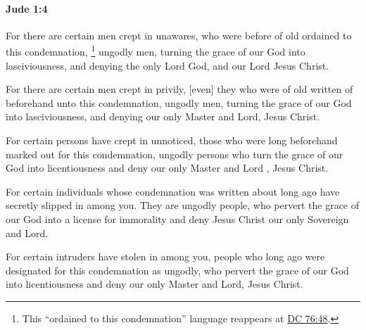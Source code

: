 		\paragraph{Jude 1:4} %
			\label{JUDE-1-4}

			For there are certain men crept in unawares, who were before of old ordained to this condemnation,%
				\footnote{%
					This ``ordained to this condemnation'' language reappears at \hyperref[DC76-48]{DC 76:48}.
					}
			ungodly men, turning the grace of our God into lasciviousness, and denying the only Lord God, and our Lord Jesus Christ.

			\begin{framed}
		\scriptsize
				\begin{compactdesc}
					\item[SBLG]  \hyperref[KRIMA]{}
					\item[ASV] For there are certain men crept in privily, [even] they who were of old written of beforehand unto this condemnation, ungodly men, turning the grace of our God into lasciviousness, and denying our only Master and Lord, Jesus Christ.
					\item[NASB] For certain persons have crept in unnoticed, those who were long beforehand marked out for this condemnation, ungodly persons who turn the grace of our God into licentiousness and deny our only Master and Lord , Jesus Christ.
					\item[NIV] For certain individuals whose condemnation was written about long ago have secretly slipped in among you. They are ungodly people, who pervert the grace of our God into a license for immorality and deny Jesus Christ our only Sovereign and Lord.
					\item[NRSV] For certain intruders have stolen in among you, people who long ago were designated for this condemnation as ungodly, who pervert the grace of our God into licentiousness and deny our only Master and Lord, Jesus Christ.
				\end{compactdesc}
			\end{framed}

